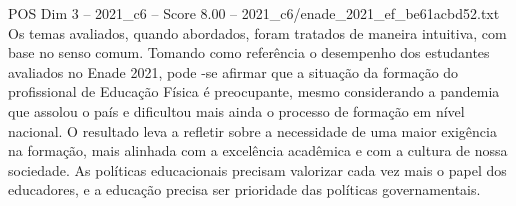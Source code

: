 \begin{textsample}{POS Dim 3 – 2021\_c6 – Score 8.00 – 2021\_c6/enade\_2021\_ef\_be61acbd52.txt}
Os temas avaliados, quando abordados, foram tratados de maneira intuitiva, com base no senso comum.
Tomando como referência o desempenho dos estudantes avaliados no Enade 2021, pode -se afirmar que a situação da formação do profissional de Educação Física é preocupante, mesmo considerando a pandemia que assolou o país e dificultou mais ainda o processo de formação em nível nacional.
O resultado leva a refletir sobre a necessidade de uma maior exigência na formação, mais alinhada com a excelência acadêmica e com a cultura de nossa sociedade.
As políticas educacionais precisam valorizar cada vez mais o papel dos educadores, e a educação precisa ser prioridade das políticas governamentais.

\end{textsample}
